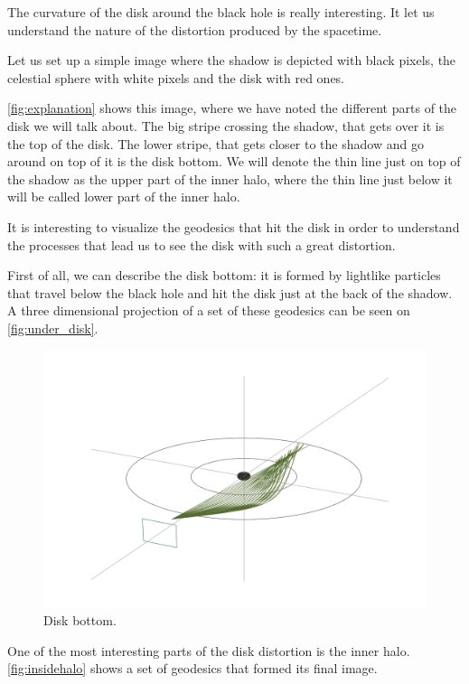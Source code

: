 The curvature of the disk around the black hole is really interesting. It let us understand the nature of the distortion produced by the spacetime.

Let us set up a simple image where the shadow is depicted with black pixels, the celestial sphere with white pixels and the disk with red ones.

\autoref{fig:explanation} shows this image, where we have noted the different parts of the disk we will talk about. The big stripe crossing the shadow, that gets over it is the top of the disk. The lower stripe, that gets closer to the shadow and go around on top of it is the disk bottom. We will denote the thin line just on top of the shadow as the upper part of the inner halo, where the thin line just below it will be called lower part of the inner halo.

It is interesting to visualize the geodesics that hit the disk in order to understand the processes that lead us to see the disk with such a great distortion.

First of all, we can describe the disk bottom: it is formed by lightlike particles that travel below the black hole and hit the disk just at the back of the shadow. A three dimensional projection of a set of these geodesics can be seen on \autoref{fig:under_disk}.

\begin{figure}[bth]
	\myfloatalign
	\includegraphics[width=\linewidth]{gfx/under_disk}
	\caption[Disk bottom.]{Disk bottom.}
	\label{fig:under_disk}
\end{figure}

One of the most interesting parts of the disk distortion is the inner halo. \autoref{fig:insidehalo} shows a set of geodesics that formed its final image.

